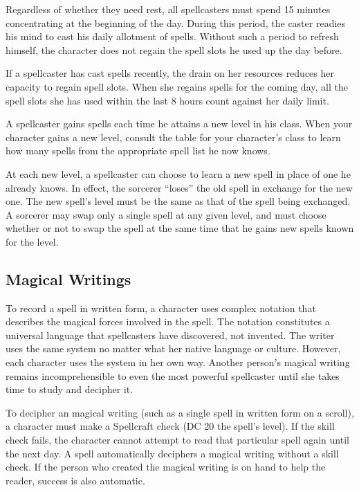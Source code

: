  Regardless of whether they need rest, all spellcasters must spend 15 minutes concentrating at the beginning of the day. During this period, the caster readies his mind to cast his daily allotment of spells. Without such a period to refresh himself, the character does not regain the spell slots he used up the day before.

 If a spellcaster has cast spells recently, the drain on her resources reduces her capacity to regain spell slots. When she regains spells for the coming day, all the spell slots she has used within the last 8 hours count against her daily limit.

 A spellcaster gains spells each time he attains a new level in his class. When your character gains a new level, consult the table for your character's class to learn how many spells from the appropriate spell list he now knows.

 At each new level, a spellcaster can choose to learn a new spell in place of one he already knows. In effect, the sorcerer ``loses'' the old spell in exchange for the new one. The new spell's level must be the same as that of the spell being exchanged. A sorcerer may swap only a single spell at any given level, and must choose whether or not to swap the spell at the same time that he gains new spells known for the level.  

\subsection{Magical Writings}
To record a spell in written form, a character uses complex notation that describes the magical forces involved in the spell. The notation constitutes a universal language that spellcasters have discovered, not invented. The writer uses the same system no matter what her native language or culture. However, each character uses the system in her own way. Another person's magical writing remains incomprehensible to even the most powerful spellcaster until she takes time to study and decipher it.

To decipher an magical writing (such as a single spell in written form on a scroll), a character must make a Spellcraft check (DC 20 \add the spell's level). If the skill check fails, the character cannot attempt to read that particular spell again until the next day. A  spell automatically deciphers a magical writing without a skill check. If the person who created the magical writing is on hand to help the reader, success is also automatic.

